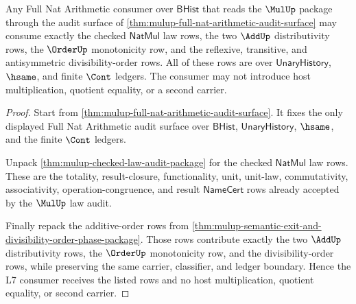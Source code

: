 \begin{theorem}
\label{thm:mulup-l7-add-order-audit-handoff}
Any Full Nat Arithmetic consumer over $\mathsf{BHist}$ that reads the
$\MulUp$ package through the audit surface of
\autoref{thm:mulup-full-nat-arithmetic-audit-surface} may consume exactly the
checked $\mathsf{NatMul}$ law rows, the two $\AddUp$ distributivity rows, the
$\OrderUp$ monotonicity row, and the reflexive, transitive, and
antisymmetric divisibility-order rows. All of these rows are over
$\mathsf{UnaryHistory}$, $\hsame$, and finite $\Cont$ ledgers. The consumer
may not introduce host multiplication, quotient equality, or a second
carrier.
\end{theorem}
\begin{proof}
Start from \autoref{thm:mulup-full-nat-arithmetic-audit-surface}. It fixes the
only displayed Full Nat Arithmetic audit surface over $\mathsf{BHist}$,
$\mathsf{UnaryHistory}$, $\hsame$, and the finite $\Cont$ ledgers.

Unpack \autoref{thm:mulup-checked-law-audit-package} for the checked
$\mathsf{NatMul}$ law rows. These are the totality, result-closure,
functionality, unit, unit-law, commutativity, associativity,
operation-congruence, and result $\mathsf{NameCert}$ rows already accepted by
the $\MulUp$ law audit.

Finally repack the additive-order rows from
\autoref{thm:mulup-semantic-exit-and-divisibility-order-phase-package}. Those
rows contribute exactly the two $\AddUp$ distributivity rows, the $\OrderUp$
monotonicity row, and the divisibility-order rows, while preserving the same
carrier, classifier, and ledger boundary. Hence the L7 consumer receives the
listed rows and no host multiplication, quotient equality, or second carrier.
\end{proof}

